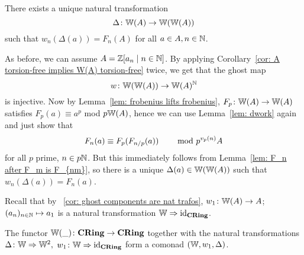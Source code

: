 \begin{proposition} \label{prop: existence of diagonal}
    There exists a unique natural transformation
    \[
      \Delta \colon \mathbb{W}(A) \to \mathbb{W}(\mathbb{W}(A))  
    \]
    such that $w_n(\Delta(a))=F_n(A)$ for all $a \in A, n \in \mathbb{N}$.
\end{proposition}
\begin{beweis}
As before, we can assume $A = \mathbb{Z}[a_n \mid n \in \mathbb{N}]$.
By applying Corollary~\ref{cor: A torsion-free implies W(A) torsion-free}
twice, we get that the ghost map 
\[
    w \colon \mathbb{W}(\mathbb{W}(A)) \to \mathbb{W}(A)^{\mathbb{N}}
\]
is injective. Now by Lemma~\ref{lem: frobenius lifts frobenius}, 
$F_p \colon \mathbb{W}(A) \to \mathbb{W}(A)$ satisfies $F_p(a) \equiv a^p$ mod $p\mathbb{W}(A)$,
hence we can use Lemma~\ref{lem: dwork} again and just show that
\[
  F_n(a)   \equiv F_p(F_{n/p}(a)) \text{\hskip8mm mod }p^{v_p(n)}A
\]
for all $p$ prime, $n \in p\mathbb{N}$. But this immediately follows from 
Lemma~\ref{lem: F_n after F_m is F_{nm}}, so there is a unique $\Delta(a)
\in \mathbb{W}(\mathbb{W}(A))$ such that $w_n(\Delta(a)) = F_n(a)$.
\end{beweis}
Recall that by ~\ref{cor: ghost components are nat trafos},
$w_1 \colon \mathbb{W}(A) \to A$; $(a_n)_{n \in \mathbb{N}} \mapsto a_1$
is a natural transformation $\mathbb{W} \Rightarrow \operatorname{id}_{\mathbf{CRing}}$.
\begin{theorem} \label{thm: comonad structure}
    The functor $\mathbb{W}(\_) \colon \mathbf{CRing} \to \mathbf{CRing}$ together with the
    natural transformations $\Delta \colon \mathbb{W} \Rightarrow \mathbb{W}^2,$ $w_1 \colon 
    \mathbb{W} \Rightarrow \operatorname{id}_{\mathbf{CRing}}$ form a comonad $(\mathbb{W},w_1,\Delta)$.
\end{theorem}
